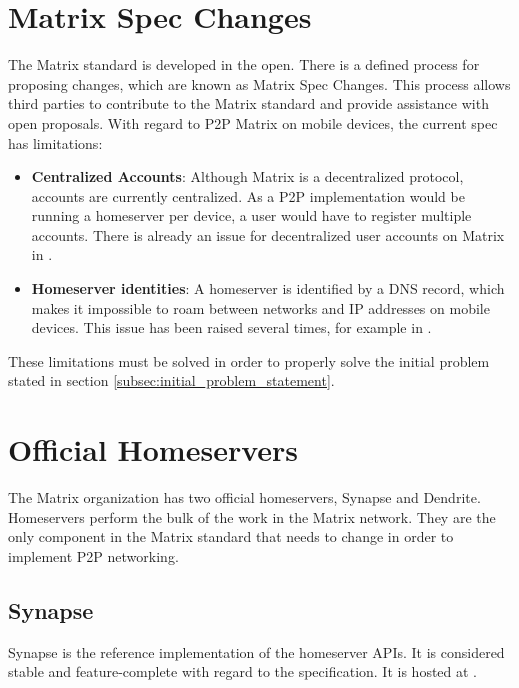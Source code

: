 \section{Matrix Spec Changes}
The Matrix standard is developed in the open.
There is a defined process for proposing changes, which are known as Matrix Spec Changes\cite{matrix_org_spec_changes}.
This process allows third parties to contribute to the Matrix standard and provide assistance with open proposals.
With regard to \ac{P2P} Matrix on mobile devices, the current spec has limitations:
\begin{itemize}
      \item{
            \textbf{Centralized Accounts}:
            Although Matrix is a decentralized protocol, accounts are currently centralized.
            As a \ac{P2P} implementation would be running a homeserver per device, a user would have to register multiple accounts.
            There is already an issue for decentralized user accounts on Matrix in .
            }
      \item{
            \textbf{Homeserver identities}:
            A homeserver is identified by a DNS record, which makes it impossible to roam between networks and IP addresses on mobile devices.
            This issue has been raised several times, for example in .
            }
\end{itemize}
These limitations must be solved in order to properly solve the initial problem stated in section \ref{subsec:initial_problem_statement}.

\section{Official Homeservers}
The Matrix organization has two official homeservers, Synapse\cite{matrix_org_synapse} and Dendrite\cite{matrix_org_dendrite}.
Homeservers perform the bulk of the work in the Matrix network.
They are the only component in the Matrix standard that needs to change in order to implement \ac{P2P} networking\cite{fosdem_event_p2p_matrix}.

\subsection{Synapse}
Synapse is the reference implementation of the homeserver \ac{API}s.
It is considered stable and feature-complete with regard to the specification.
It is hosted at .

